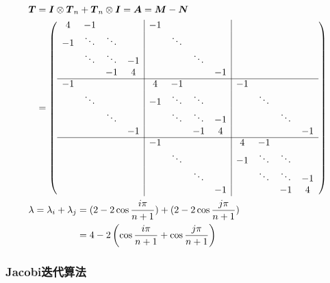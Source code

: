 \documentclass[12pt, UTF8, nofonts]{ctexart}
\begin{document}
\begin{equation}
    \label{eq:coeffmat}
    \begin{aligned}
        & \begin{aligned}
            \boldsymbol{T} &= \boldsymbol{I} \otimes \boldsymbol{T}_n + \boldsymbol{T}_n \otimes \boldsymbol{I} = \boldsymbol{A} = \boldsymbol{M} - \boldsymbol{N} \\
            &= \left(\begin{array}{cccc|cccc|cccc}
            4 & -1 & ~ & ~ & -1 & ~ & ~ & ~ & ~ & ~ & ~ & ~ \\
            -1 & \ddots & \ddots & ~ & ~ & \ddots & ~ & ~ & ~ & ~ & ~ & ~ \\
            ~ & \ddots & \ddots & -1 & ~ & ~ & \ddots & ~ & ~ & ~ & ~ & ~ \\
            ~ & ~ & -1 & 4 & ~ & ~ & ~ & -1 & ~ & ~ & ~ & ~ \\ \cline{1-12}
            -1 & ~ & ~ & ~ & 4 & -1 & ~ & ~ & -1 & ~ & ~ & ~ \\
            ~ & \ddots & ~ & ~ & -1 & \ddots & \ddots & ~ & ~ & \ddots & ~ & ~ \\
            ~ & ~ & \ddots & ~ & ~ & \ddots & \ddots & -1 & ~ & ~ & \ddots & ~ \\
            ~ & ~ & ~ & -1 & ~ & ~ & -1 & 4 & ~ & ~ & ~ & -1 \\ \cline{1-12}
            ~ & ~ & ~ & ~ & -1 & ~ & ~ & ~ & 4 & -1 & ~ & ~ \\
            ~ & ~ & ~ & ~ & ~ & \ddots & ~ & ~ & -1 & \ddots & \ddots & ~ \\
            ~ & ~ & ~ & ~ & ~ & ~ & \ddots & ~ & ~ & \ddots & \ddots & -1 \\
            ~ & ~ & ~ & ~ & ~ & ~ & ~ & -1 & ~ & ~ & -1 & 4 \\
            \end{array}\right)
        \end{aligned} \\
        & \begin{aligned}
            \lambda = \lambda_i + \lambda_j &= (2-2\cos\dfrac{i\pi}{n+1}) + (2-2\cos\dfrac{j\pi}{n+1}) \\
            & = 4 - 2\left(\cos\dfrac{i\pi}{n+1} + \cos\dfrac{j\pi}{n+1}\right)
        \end{aligned} \\
    \end{aligned}
\end{equation}

\subsubsection*{Jacobi迭代算法}
\end{document}

